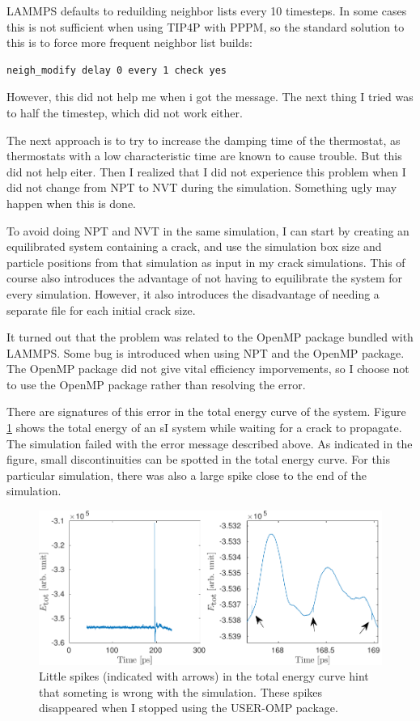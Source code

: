LAMMPS defaults to reduilding neighbor lists every 10 timesteps. In some cases this is not sufficient when using TIP4P with PPPM, so the standard solution to this is to force more frequent neighbor list builds:

\begin{lstlisting}[language=LammpsInput]
neigh_modify delay 0 every 1 check yes
\end{lstlisting}

However, this did not help me when i got the message. The next thing I tried was to half the timestep, which did not work either.

The next approach is to try to increase the damping time of the thermostat, as thermostats with a low characteristic time are known to cause trouble. But this did not help eiter. Then I realized that I did not experience this problem when I did not change from NPT to NVT during the simulation. Something ugly may happen when this is done.

To avoid doing NPT and NVT in the same simulation, I can start by creating an equilibrated system containing a crack, and use the simulation box size and particle positions from that simulation as input in my crack simulations. This of course also introduces the advantage of not having to equilibrate the system for every simulation. However, it also introduces the disadvantage of needing a separate file for each initial crack size.

It turned out that the problem was related to the OpenMP package bundled with LAMMPS. Some bug is introduced when using NPT and the OpenMP package. The OpenMP package did not give vital efficiency imporvements, so I choose not to use the OpenMP package rather than resolving the error.

There are signatures of this error in the total energy curve of the system. Figure \ref{fig:toteng_omp_bug} shows the total energy of an sI system while waiting for a crack to propagate. The simulation failed with the error message described above. As indicated in the figure, small discontinuities can be spotted in the total energy curve. For this particular simulation, there was also a large spike close to the end of the simulation. 

\begin{figure}
\centering
\includegraphics[width=\textwidth]{../figures/thesis/toteng_omp_bug.pdf}
\caption{Little spikes (indicated with arrows) in the total energy curve hint that someting is wrong with the simulation. These spikes disappeared when I stopped using the USER-OMP package.}
\label{fig:toteng_omp_bug}
\end{figure}
